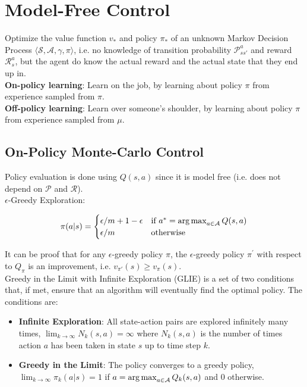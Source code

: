 \section{Model-Free Control}

Optimize the value function $v_*$ and policy $\pi_*$ of an unknown Markov
Decision Process $\langle \mathcal{S}, \mathcal{A}, \gamma, \pi \rangle$, i.e.
no knowledge of transition probability $\mathcal{P}_{ss\prime}^a$ and reward
$\mathcal{R}_s^a$, but the agent do know the actual reward and the actual state
that they end up in.\\

\noindent \textbf{On-policy learning}: Learn on the job, by learning about policy $\pi$ from
experience sampled from $\pi$. \\

\noindent \textbf{Off-policy learning}: Learn over someone's shoulder, by learning about policy
$\pi$ from experience sampled from $\mu$.

\subsection{On-Policy Monte-Carlo Control}

Policy evaluation is done using $Q(s, a)$ since it is model free (i.e. does not
depend on $\mathcal{P}$ and $\mathcal{R}$). \\

\noindent $\epsilon$-Greedy Exploration:

\begin{equation*}
    \pi(a|s) = \begin{cases}
        \epsilon / m + 1 - \epsilon & \text{if } a^* = \operatorname*{arg\,max}_{a \in \mathcal{A}} Q(s, a) \\
        \epsilon / m                & \text{otherwise}
    \end{cases}
\end{equation*}

\noindent It can be proof that for any $\epsilon$-greedy policy $\pi$, the
$\epsilon$-greedy policy $\pi^\prime$ with respect to $Q_\pi$ is an
improvement, i.e. $v_{\pi\prime}(s) \ge v_\pi(s)$. \\

\noindent Greedy in the Limit with Infinite Exploration (GLIE) is a set of two conditions
that, if met, ensure that an algorithm will eventually find the optimal policy.
The conditions are:

\begin{itemize}
    \item \textbf{Infinite Exploration}: All state-action pairs are explored infinitely many times,
          $\lim_{k \to \infty} N_k(s, a) = \infty$ where $N_k(s, a)$ is the number of times action
          $a$ has been taken in state $s$ up to time step $k$.
    \item \textbf{Greedy in the Limit}: The policy converges to a greedy policy,
          $\lim_{k \to \infty} \pi_k(a|s) = 1$ if $a = \operatorname*{arg\,max}_{a \in \mathcal{A}} Q_k(s, a)$ and
          0 otherwise.
\end{itemize}

